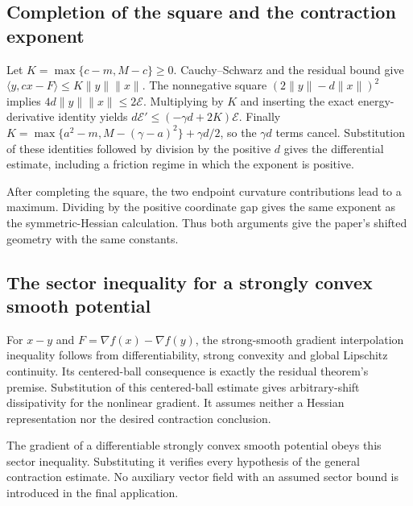 \documentclass[11pt,a4paper]{report}
\begin{document}
\subsection{\texorpdfstring{Completion of the square and the contraction exponent}{Completion of the square and the contraction exponent}}
\label{report-step-KineticLangevin-GeneralContraction-lean-3}


Let \(K=\max\{c-m,M-c\}\ge0\). Cauchy–Schwarz and the residual bound give \(\langle y,cx-F\rangle\le K\|y\|\|x\|\). The nonnegative square \((2\|y\|-d\|x\|)^2\) implies \(4d\|y\|\|x\|\le2\mathcal E\). Multiplying by \(K\) and inserting the exact energy-derivative identity yields \(d\mathcal E'\le(-\gamma d+2K)\mathcal E\). Finally \(K=\max\{a^2-m,M-(\gamma-a)^2\}+\gamma d/2\), so the \(\gamma d\) terms cancel. Substitution of these identities followed by division by the positive \(d\) gives the differential estimate, including a friction regime in which the exponent is positive.



After completing the square, the two endpoint curvature contributions lead to a maximum. Dividing by the positive coordinate gap gives the same exponent as the symmetric-Hessian calculation. Thus both arguments give the paper’s shifted geometry with the same constants.

\subsection{\texorpdfstring{The sector inequality for a strongly convex smooth potential}{The sector inequality for a strongly convex smooth potential}}
\label{report-step-KineticLangevin-GeneralContraction-lean-4}


For \(x-y\) and \(F=\nabla f(x)-\nabla f(y)\), the strong-smooth gradient interpolation inequality follows from differentiability, strong convexity and global Lipschitz continuity. Its centered-ball consequence is exactly the residual theorem's premise. Substitution of this centered-ball estimate gives arbitrary-shift dissipativity for the nonlinear gradient. It assumes neither a Hessian representation nor the desired contraction conclusion.



The gradient of a differentiable strongly convex smooth potential obeys this sector inequality. Substituting it verifies every hypothesis of the general contraction estimate. No auxiliary vector field with an assumed sector bound is introduced in the final application.
\end{document}
